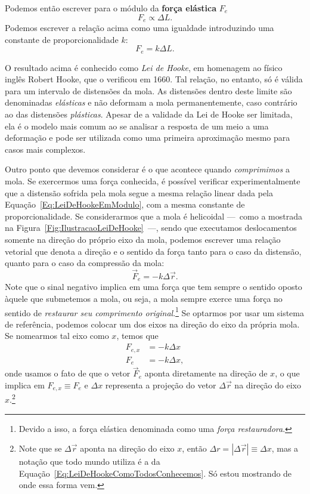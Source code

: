 Podemos então escrever para o módulo da \textbf{força elástica} $F_e$
\begin{equation}
	F_e \propto \Delta L.
\end{equation}
%
Podemos escrever a relação acima como uma igualdade introduzindo uma constante de proporcionalidade $k$:
\begin{equation}\label{Eq:LeiDeHookeEmModulo}
	F_e = k \Delta L.
\end{equation}

O resultado acima é conhecido como \emph{Lei de Hooke}, em homenagem ao físico inglês Robert Hooke, que o verificou em 1660. Tal relação, no entanto, só é válida para um intervalo de distensões da mola. As distensões dentro deste limite são denominadas \emph{elásticas} e não deformam a mola permanentemente, caso contrário ao das distensões \emph{plásticas}. Apesar de a validade da Lei de Hooke ser limitada, ela é o modelo mais comum ao se analisar a resposta de um meio a uma deformação e pode ser utilizada como uma primeira aproximação mesmo para casos mais complexos.

Outro ponto que devemos considerar é o que acontece quando \emph{comprimimos} a mola. Se exercermos uma força conhecida, é possível verificar experimentalmente que a distensão sofrida pela mola segue a mesma relação linear dada pela Equação~\eqref{Eq:LeiDeHookeEmModulo}, com a mesma constante de proporcionalidade. Se considerarmos que a mola é helicoidal ---~como a mostrada na Figura~\ref{Fig:IlustracaoLeiDeHooke}~---, sendo que executamos deslocamentos somente na direção do próprio eixo da mola, podemos escrever uma relação vetorial que denota a direção e o sentido da força tanto para o caso da distensão, quanto para o caso da compressão da mola:
\begin{equation}
    \vec{F}_e = - k \Delta \vec{r}.
\end{equation}
%
Note que o sinal negativo implica em uma força que tem sempre o sentido oposto àquele que submetemos a mola, ou seja, a mola sempre exerce uma força no sentido de \emph{restaurar seu comprimento original}.\footnote{ Devido a isso, a força elástica denominada como uma \emph{força restauradora}.} Se optarmos por usar um sistema de referência, podemos colocar um dos eixos na direção do eixo da própria mola. Se nomearmos tal eixo como $x$, temos que
\begin{align}
    F_{e,x} &= -k \Delta x \\
    F_e &= -k \Delta x, \label{Eq:LeiDeHookeComoTodosConhecemos}
\end{align}
%
onde usamos o fato de que o vetor $\vec{F}_{e}$ aponta diretamente na direção de $x$, o que implica em $F_{e,x} \equiv F_e$ e $\Delta x$ representa a projeção do vetor $\Delta \vec{r}$ na direção do eixo $x$.\footnote[][-1cm]{Note que se $\Delta \vec{r}$ aponta na direção do eixo $x$, então $\Delta r = |\Delta \vec{r}| \equiv \Delta x$, mas a notação que todo mundo utiliza é a da Equação~\eqref{Eq:LeiDeHookeComoTodosConhecemos}. Só estou mostrando de onde essa forma vem.}

